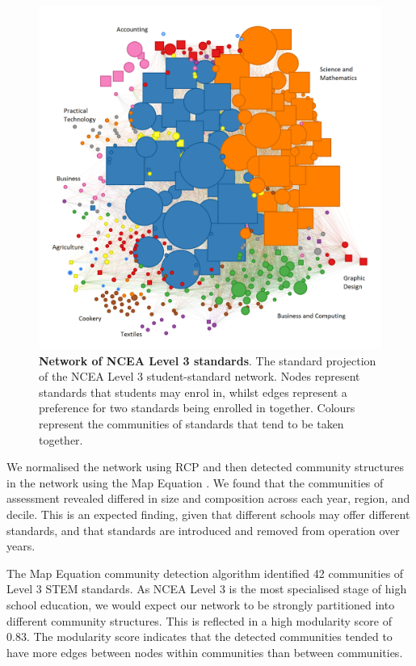 \begin{landscape}
\begin{figure}
    \centering
    \includegraphics[width = \textwidth]{L3NCEA_STEM_Network_All.png}
    \caption{\textbf{Network of NCEA Level 3 standards}. The standard projection of the NCEA Level 3 student-standard network. Nodes represent standards that students may enrol in, whilst edges represent a preference for two standards being enrolled in together. Colours represent the communities of standards that tend to be taken together. }
    \label{fig:NetworkAll}
\end{figure}
\end{landscape} We normalised the network using RCP and then detected community structures in the network using the Map Equation \cite{rosvall2009map}. We found that the communities of assessment revealed differed in size and composition across each year, region, and decile. This is an expected finding, given that different schools may offer different standards, and that standards are introduced and removed from operation over years.

The Map Equation community detection algorithm identified 42 communities of Level 3 STEM standards. As NCEA Level 3 is the most specialised stage of high school education, we would expect our network to be strongly partitioned into different community structures. This is reflected in a high  modularity score of 0.83. The modularity score indicates that the detected communities tended to have more edges between nodes within communities than between communities. 

